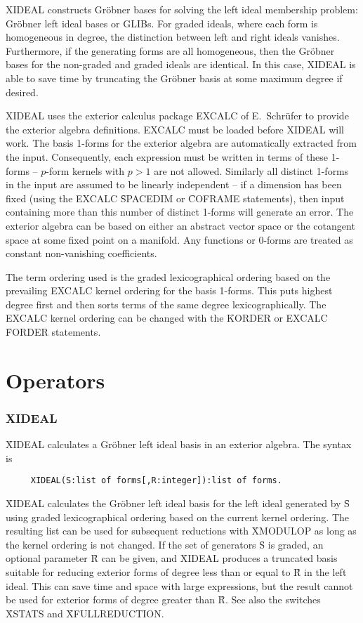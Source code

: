 XIDEAL constructs Gr\"obner bases for solving the left ideal membership
problem: Gr\"obner left ideal bases or GLIBs. For graded ideals, where each
form is homogeneous in degree, the distinction between left and right
ideals vanishes. Furthermore, if the generating forms are all homogeneous,
then the Gr\"obner bases for the non-graded and graded ideals are
identical. In this case, XIDEAL is able to save time by truncating the
Gr\"obner basis at some maximum degree if desired.

XIDEAL uses the exterior calculus package EXCALC of E.~Schr\"ufer
\cite{EXCALC} to provide the exterior algebra definitions. EXCALC must be
loaded before XIDEAL will work. The basis 1-forms for the exterior algebra
are automatically extracted from the input. Consequently, each expression
must be written in terms of these 1-forms -- $p$-form kernels with $p>1$
are not allowed. Similarly all distinct 1-forms in the input are assumed to
be linearly independent -- if a dimension has been fixed (using the EXCALC
\f{SPACEDIM} or \f{COFRAME} statements), then input containing more than this
number of distinct 1-forms will generate an error. The exterior algebra can
be based on either an abstract vector space or the cotangent space at some
fixed point on a manifold. Any functions or 0-forms are treated as constant
non-vanishing coefficients.

The term ordering used is the graded lexicographical ordering based on the
prevailing EXCALC kernel ordering for the basis 1-forms. This puts
highest degree first and then sorts terms of the same degree
lexicographically. The EXCALC kernel ordering can be changed with the
\REDUCE{} \f{KORDER} or EXCALC \f{FORDER} statements.


\section{Operators}

\subsubsection*{XIDEAL}

\f{XIDEAL} calculates a Gr\"obner left ideal basis in
an exterior algebra. The syntax is
\begin{verbatim}
     XIDEAL(S:list of forms[,R:integer]):list of forms.
\end{verbatim}
\f{XIDEAL} calculates the Gr\"obner left ideal basis for the left ideal
generated by \f{S} using graded lexicographical ordering based on the
current kernel ordering. The resulting list can be used for subsequent
reductions with \f{XMODULOP} as long as the kernel ordering is not
changed. If the set of generators \f{S} is graded, an optional parameter
\f{R} can be given, and \f{XIDEAL} produces a truncated basis suitable for
reducing exterior forms of degree less than or equal to \f{R} in the left
ideal. This can save time and space with large expressions, but the result
cannot be used for exterior forms of degree greater than \f{R}. See also
the switches \f{XSTATS} and \f{XFULLREDUCTION}.


